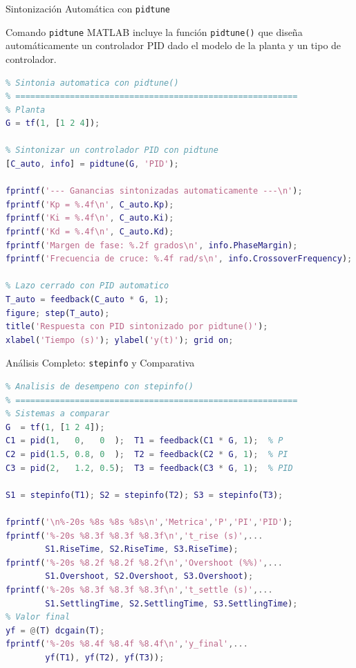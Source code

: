 \documentclass[aspectratio=169,xcolor=dvipsnames]{beamer}
\begin{document}
\begin{frame}[fragile]{Sintonización Automática con \texttt{pidtune}}
    \begin{block}{Comando \texttt{pidtune}}
        MATLAB incluye la función \texttt{pidtune()} que diseña automáticamente un controlador PID dado el modelo de la planta y un tipo de controlador.
    \end{block}
\begin{lstlisting}[language=Matlab, style=MATLABStyle]
% =========================================================
% Sintonia automatica con pidtune()
% =========================================================
% Planta
G = tf(1, [1 2 4]);

% Sintonizar un controlador PID con pidtune
[C_auto, info] = pidtune(G, 'PID');

fprintf('--- Ganancias sintonizadas automaticamente ---\n');
fprintf('Kp = %.4f\n', C_auto.Kp);
fprintf('Ki = %.4f\n', C_auto.Ki);
fprintf('Kd = %.4f\n', C_auto.Kd);
fprintf('Margen de fase: %.2f grados\n', info.PhaseMargin);
fprintf('Frecuencia de cruce: %.4f rad/s\n', info.CrossoverFrequency);

% Lazo cerrado con PID automatico
T_auto = feedback(C_auto * G, 1);
figure; step(T_auto);
title('Respuesta con PID sintonizado por pidtune()');
xlabel('Tiempo (s)'); ylabel('y(t)'); grid on;
\end{lstlisting}
\end{frame}

\begin{frame}[fragile]{Análisis Completo: \texttt{stepinfo} y Comparativa}
\begin{lstlisting}[language=Matlab, style=MATLABStyle]
% =========================================================
% Analisis de desempeno con stepinfo()
% =========================================================
% Sistemas a comparar
G  = tf(1, [1 2 4]);
C1 = pid(1,   0,   0  );  T1 = feedback(C1 * G, 1);  % P
C2 = pid(1.5, 0.8, 0  );  T2 = feedback(C2 * G, 1);  % PI
C3 = pid(2,   1.2, 0.5);  T3 = feedback(C3 * G, 1);  % PID

S1 = stepinfo(T1); S2 = stepinfo(T2); S3 = stepinfo(T3);

fprintf('\n%-20s %8s %8s %8s\n','Metrica','P','PI','PID');
fprintf('%-20s %8.3f %8.3f %8.3f\n','t_rise (s)',...
        S1.RiseTime, S2.RiseTime, S3.RiseTime);
fprintf('%-20s %8.2f %8.2f %8.2f\n','Overshoot (%%)',...
        S1.Overshoot, S2.Overshoot, S3.Overshoot);
fprintf('%-20s %8.3f %8.3f %8.3f\n','t_settle (s)',...
        S1.SettlingTime, S2.SettlingTime, S3.SettlingTime);
% Valor final
yf = @(T) dcgain(T);
fprintf('%-20s %8.4f %8.4f %8.4f\n','y_final',...
        yf(T1), yf(T2), yf(T3));
\end{lstlisting}
\end{frame}
\end{document}

